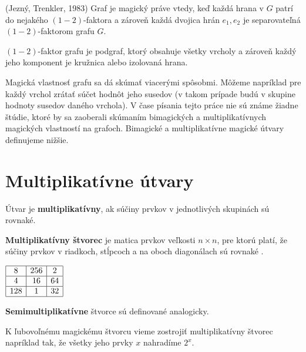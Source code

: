 \begin{theorem} (Jezný, Trenkler, 1983) Graf je magický práve vtedy, keď každá hrana v $G$ patrí do nejakého $(1-2)$-faktora a zároveň každá dvojica hrán $e_1, e_2$ je separovateľná $(1-2)$-faktorom grafu $G$.
\end{theorem}

\begin{note} $(1-2)$-faktor grafu je podgraf, ktorý obsahuje všetky vrcholy a zároveň každý jeho komponent je kružnica alebo izolovaná hrana. 
\end{note} 

Magická vlastnosť grafu sa dá skúmať viacerými spôsobmi. Môžeme napríklad pre každý vrchol zrátať súčet hodnôt jeho susedov (v takom prípade budú v skupine hodnoty susedov daného vrchola). V čase písania tejto práce nie sú známe žiadne štúdie, ktoré by sa zaoberali skúmaním bimagických a multiplikatívnych magických vlastností na grafoch. Bimagické a multiplikatívne magické útvary definujeme nižšie.

\section{Multiplikatívne útvary}
\begin{definition} Útvar je \textbf{multiplikatívny}, ak súčiny prvkov v jednotlivých skupinách sú rovnaké.
\end{definition}

\begin{definition} \textbf{Multiplikatívny štvorec} je matica prvkov veľkosti $n \times n$, pre ktorú platí, že súčiny prvkov v riadkoch, stĺpcoch a na oboch diagonálach sú rovnaké \cite{multimagie}.
\end{definition}

\begin{center}
$\begin{array}{ |c|c|c| } 
\hline
8 & 256 & 2 \\ 
\hline
4 & 16 & 64 \\ 
\hline
128 & 1 & 32 \\
\hline
\end{array}$
\end{center}

\begin{note} \textbf{Semimultiplikatívne} štvorce sú definované analogicky.
\end{note}

K ľubovoľnému magickému štvorcu vieme zostrojiť multiplikatívny štvorec napríklad tak, že všetky jeho prvky $x$ nahradíme $2^x$.


